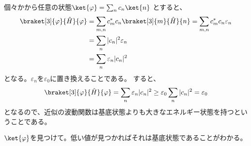 \documentclass[titlepage]{ltjsarticle}
\newcommand{\mel}[3]{\braket[3]{#1}{#2}{#3}}
\begin{document}
個々かから任意の状態\(\ket{\varphi} = \sum_n c_n \ket{n}\)
とすると、
\begin{align}
  \mel{\varphi}{\hat{H}}{\varphi}  & = \sum_{m,n} c_m^* c_n \mel{m}{\hat{H}}{n} = \sum_{m,n} c_m^* c_n \varepsilon_n \\
  & = \sum_{n} |c_n|^2 \varepsilon_n \\
  & = \sum_n \varepsilon_n |c_n|^2
\end{align}
となる。\(\varepsilon_n\)を\(\varepsilon_0\)に置き換えることである。
すると、
\begin{equation}
  \mel{\varphi}{\hat{H}}{\varphi}  = \sum_n \varepsilon_n |c_n|^2 \ge \varepsilon_0 \sum_n |c_n|^2 = \varepsilon_0
\end{equation}
となるので、近似の波動関数は基底状態よりも大きなエネルギー状態を持つということである。


\(\ket{\varphi}\)を見つけて。低い値が見つかればそれは基底状態であることがわかる。



\end{document}
